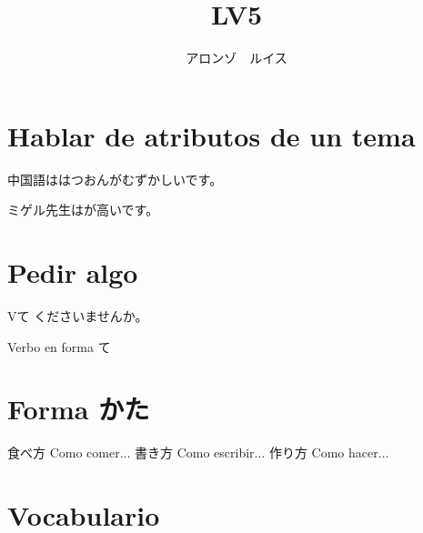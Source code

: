 \documentclass[a4paper,lualatex,ja=standard,base=10pt]{bxjsarticle}
\title{\ruby{第|０９|課}{だい||か} LV5}
\author{アロンゾ　ルイス}
\begin{document}
\setcounter{page}{1}

\maketitle{}
\thispagestyle{fancy}

\section{Hablar de atributos de un tema}

中国語ははつおんがむずかしいです。

ミゲル先生はが高いです。

\section{Pedir algo}

Vて くださいませんか。

Verbo en forma て

\section{Forma かた}

食べ方 Como comer...
書き方 Como escribir...
作り方 Como hacer...

\section{Vocabulario}
\end{document}
